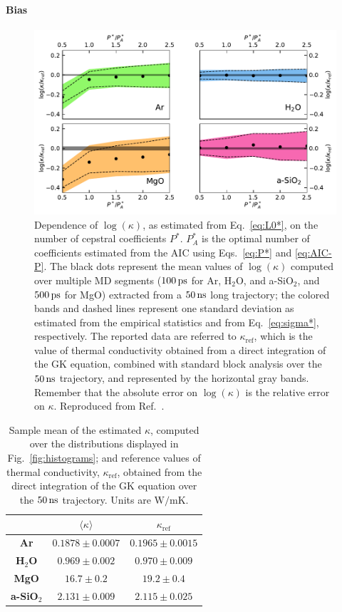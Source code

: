\paragraph{Bias}
\begin{figure}[!tb]
    \centering
    \includegraphics[width=\textwidth]{chapters/chapter5/figures/L-vs-P.pdf}
    \caption{Dependence of $\log(\kappa)$, as estimated from Eq.~\eqref{eq:L0*}, on the number of cepstral coefficients $P^*$. $P_A^*$ is the optimal number of coefficients estimated from the AIC using Eqs.~\eqref{eq:P*} and \eqref{eq:AIC-P}. The black dots represent the mean values of $\log(\kappa)$ computed over multiple MD segments ($100\,\mathrm{ps}$ for Ar, H$_2$O, and a-SiO$_2$, and $500\,\mathrm{ps}$ for MgO) extracted from a $50\,\mathrm{ns}$ long trajectory; the colored bands and dashed lines represent one standard deviation as estimated from the empirical statistics and from Eq.~\eqref{eq:sigma*}, respectively. The reported data are referred to $\kappa_{\mathrm{ref}}$, which is the value of thermal conductivity obtained from a direct integration of the GK equation, combined with standard block analysis over the $50\,\mathrm{ns}$ trajectory, and represented by the horizontal gray bands. Remember that the absolute error on $\log(\kappa)$ is the relative error on $\kappa$. Reproduced from Ref.~\cite{Ercole2017}.
    }
    \label{fig:L-vs-P}
\end{figure}
\begin{table}[!htb]
    \centering
    \begin{tabular}{ccc}
                  & $\langle\kappa\rangle$ & $\kappa_\mathrm{ref}$ \\
        \hline
        \textbf{Ar}        & $0.1878 \pm 0.0007$ & $0.1965 \pm 0.0015$ \\
        \textbf{H$_2$O}    & $0.969 \pm 0.002$   & $0.970 \pm 0.009$ \\
        \textbf{MgO}       & $16.7 \pm 0.2$      & $19.2 \pm 0.4$ \\
        \textbf{a-SiO$_2$} & $2.131 \pm 0.009$   & $2.115 \pm 0.025$ \\
    \end{tabular}
    \caption{Sample mean of the estimated $\kappa$, computed over the distributions displayed in Fig.~\ref{fig:histograms}; and reference values of thermal conductivity, $\kappa_\mathrm{ref}$, obtained from the direct integration of the GK equation over the $50\,\mathrm{ns}$ trajectory. Units are $\mathrm{W/mK}$.}
    \label{tab:kappa-bias}
\end{table}
